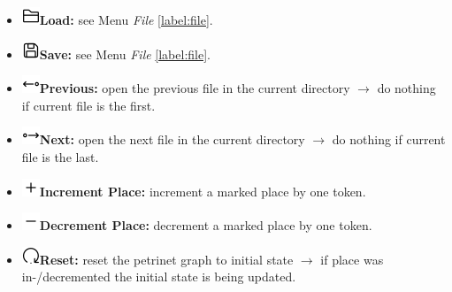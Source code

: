 \documentclass[10pt, a4paper]{article}
\begin{document}
\begin{itemize}

\item\includegraphics[scale=0.4]{../src/resources/images/Toolbar/folder.png}\hspace{0.1cm}\textbf{Load:} see Menu \textit{File} \ref{label:file}.
\item\includegraphics[scale=0.4]{../src/resources/images/Toolbar/save.png}\hspace{0.1cm}\textbf{Save:} see Menu \textit{File} \ref{label:file}.
\item\includegraphics[scale=0.4]{../src/resources/images/Toolbar/left.png}\hspace{0.1cm}\textbf{Previous:} open the previous file in the current directory $\rightarrow$ do nothing if current file is the first.
\item\includegraphics[scale=0.4]{../src/resources/images/Toolbar/right.png}\hspace{0.1cm}\textbf{Next:} open the next file in the current directory $\rightarrow$ do nothing if current file is the last.
\item\includegraphics[scale=0.4]{../src/resources/images/Toolbar/plus.png}\hspace{0.1cm}\textbf{Increment Place:} increment a marked place by one token.
\item\includegraphics[scale=0.4]{../src/resources/images/Toolbar/minus.png}\hspace{0.1cm}\textbf{Decrement Place:} decrement a marked place by one token.
\item\includegraphics[scale=0.4]{../src/resources/images/Toolbar/restart.png}\hspace{0.1cm}\textbf{Reset:} reset the petrinet graph to initial state $\rightarrow$ if place was in-/decremented the initial state is being updated.

\end{itemize}
\end{document}
